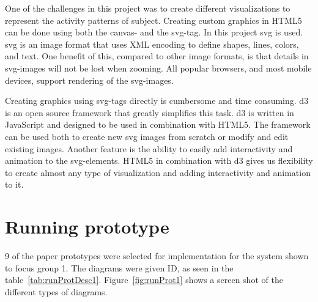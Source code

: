 One of the challenges in this project was to create different visualizations to represent the activity patterns of subject. Creating custom graphics in HTML5 can be done using both the canvas- and the svg-tag. In this project \gls{svg} is used. \gls{svg} is an image format that uses XML encoding to define shapes, lines, colors, and text. One benefit of this, compared to other image formats, is that details in \gls{svg}-images will not be lost when zooming. All popular browsers, and most mobile devices, support rendering of the \gls{svg}-images.

Creating graphics using svg-tags directly is cumbersome and time consuming. \gls{d3} is an open source framework that greatly simplifies this task. \gls{d3} is written in JavaScript and designed to be used in combination with HTML5. The framework can be used both to create new \gls{svg} images from scratch or modify and edit existing images. Another feature is the ability to easily add interactivity and animation to the \gls{svg}-elements. HTML5 in combination with \gls{d3} gives us flexibility to create almost any type of visualization and adding interactivity and animation to it.

\section{Running prototype}
9 of the paper prototypes were selected for implementation for the system shown to focus group 1. The diagrams were given ID, as seen in the table~\ref{tab:runProtDesc1}. Figure~\ref{fig:runProt1} shows a screen shot of the different types of diagrams. 

